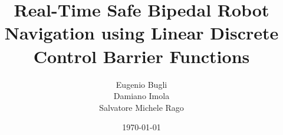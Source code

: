 \documentclass[12pt,a4paper,oneside]{article}
\title{Real-Time Safe Bipedal Robot Navigation using Linear Discrete Control Barrier Functions} %
\author{Eugenio Bugli \\ Damiano Imola \\ Salvatore Michele Rago} %
\date{\today}									    %
\theoremstyle{definition}
\begin{document}

\newpage

\tableofcontents
\newpage


\clearpage


\clearpage



\nocite{*}  %
\end{document}
